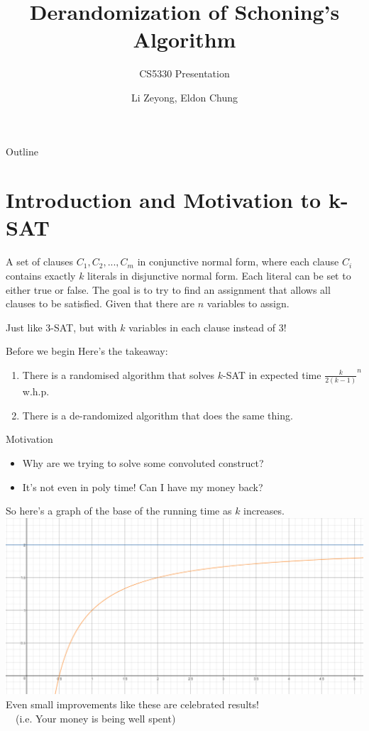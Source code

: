 \documentclass[pdf] {beamer}
\title{Derandomization of Schoning's Algorithm}
\subtitle{CS5330 Presentation}
\author{Li Zeyong, Eldon Chung}
\begin{document}
\begin{frame}
	\titlepage
	
\end{frame}

\begin{frame}{Outline}
	\tableofcontents
\end{frame}

\section{Introduction and Motivation to k-SAT}
	\begin{frame}
		\begin{definition}[k-Satisfiability]
			A set of clauses $C_1, C_2, ..., C_m$ in conjunctive normal form, where 			each clause $C_i$ contains exactly $k$ literals in disjunctive normal form. Each literal can be set to either true or false. The goal is to try to find an assignment that allows all clauses to be satisfied. Given that there are $n$ variables to assign.		
		\end{definition}
		\begin{definition}
			Just like 3-SAT, but with $k$ variables in each clause instead of 3!
		\end{definition}
	\end{frame}
	\begin{frame}{Before we begin}
		Here's the takeaway:
		\begin{enumerate}
			\item There is a randomised algorithm that solves $k$-SAT in expected time $\frac{k}{2(k-1)}^n$ w.h.p.
			\item There is a de-randomized algorithm that does the same thing.
		\end{enumerate}
	\end{frame}
	\begin{frame}{Motivation}
		\begin{itemize}[FAQ]
			\item<1-> Why are we trying to solve some convoluted construct?
			\item<2-> It's not even in poly time! Can I have my money back? 
		\end{itemize}
	\end{frame}
	\begin{frame}
		So here's a graph of the base of the running time as $k$ increases.
		\includegraphics[scale=0.35]{graph.png}
		Even small improvements like these are celebrated results! \\~\ (i.e. Your money is being well spent)
	\end{frame}
\end{document}

